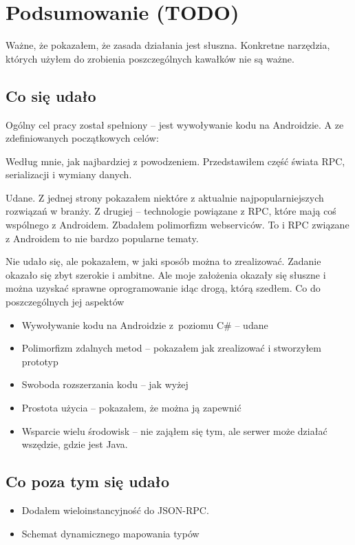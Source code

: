 \chapter{Podsumowanie (TODO)}
Ważne, że pokazałem, że zasada działania jest słuszna. Konkretne narzędzia, których użyłem do zrobienia poszczególnych kawałków nie są ważne.

\section{Co się udało}
Ogólny cel pracy został spełniony -- jest wywoływanie kodu na Androidzie. A ze zdefiniowanych początkowych celów:
\begin{description}
Według mnie, jak najbardziej z powodzeniem. Przedstawiłem część świata RPC, serializacji i wymiany danych.

Udane. Z jednej strony pokazałem niektóre z aktualnie najpopularniejszych rozwiązań w branży. Z drugiej -- technologie powiązane z RPC, które mają coś wspólnego z Androidem. Zbadałem polimorfizm webserviców. To i RPC związane z Androidem to nie bardzo popularne tematy.

Nie udało się, ale pokazałem, w jaki sposób można to zrealizować. Zadanie okazało się zbyt szerokie i ambitne. Ale moje założenia okazały się słuszne i można uzyskać sprawne oprogramowanie idąc drogą, którą szedłem. Co do poszczególnych jej aspektów
\begin{itemize}
  \item Wywoływanie kodu na Androidzie z~poziomu C\# -- udane
	\item Polimorfizm zdalnych metod -- pokazałem jak zrealizować i stworzyłem prototyp
	\item Swoboda rozszerzania kodu -- jak wyżej
	\item Prostota użycia -- pokazałem, że można ją zapewnić
	\item Wsparcie wielu środowisk -- nie zająłem się tym, ale serwer może działać wszędzie, gdzie jest Java.
\end{itemize}

\end{description}

\section{Co poza tym się udało}
\begin{itemize}
	\item Dodałem wieloinstancyjność do JSON-RPC.
	\item Schemat dynamicznego mapowania typów
\end{itemize}


